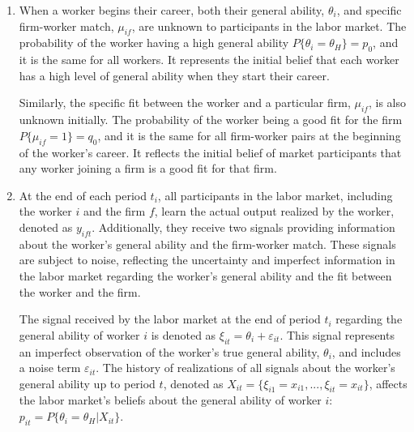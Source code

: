 \documentclass[12pt]{article}
\begin{document}
\begin{enumerate}[label={A}{\arabic*}.]
    \item When a worker begins their career, both their general ability, $\theta_i$, and specific firm-worker match, $\mu_{if}$, are unknown to participants in the labor market. The probability of the worker having a high general ability $P\{\theta_i = \theta_H\} = p_0$, and it is the same for all workers. It represents the initial belief that each worker has a high level of general ability when they start their career.

    Similarly, the specific fit between the worker and a particular firm, $\mu_{if}$, is also unknown initially. The probability of the worker being a good fit for the firm $P\{\mu_{if} = 1\} = q_0$, and it is the same for all firm-worker pairs at the beginning of the worker's career. It reflects the initial belief of market participants that any worker joining a firm is a good fit for that firm.

    \item At the end of each period $t_i$, all participants in the labor market, including the worker $i$ and the firm $f$, learn the actual output realized by the worker, denoted as $y_{ift}$. Additionally, they receive two signals providing information about the worker's general ability and the firm-worker match. These signals are subject to noise, reflecting the uncertainty and imperfect information in the labor market regarding the worker's general ability and the fit between the worker and the firm.

    The signal received by the labor market at the end of period $t_i$ regarding the general ability of worker $i$ is denoted as $\xi_{it} = \theta_i + \varepsilon_{it}$. This signal represents an imperfect observation of the worker's true general ability, $\theta_i$, and includes a noise term $\varepsilon_{it}$. The history of realizations of all signals about the worker's general ability up to period $t$, denoted as $X_{it} = \{\xi_{i1}= x_{i1}, ..., \xi_{it} = x_{it}\}$, affects the labor market's beliefs about the general ability of worker $i$: $p_{it} = P\{\theta_i = \theta_H | X_{it}\}$. 


\end{enumerate}
\end{document}
